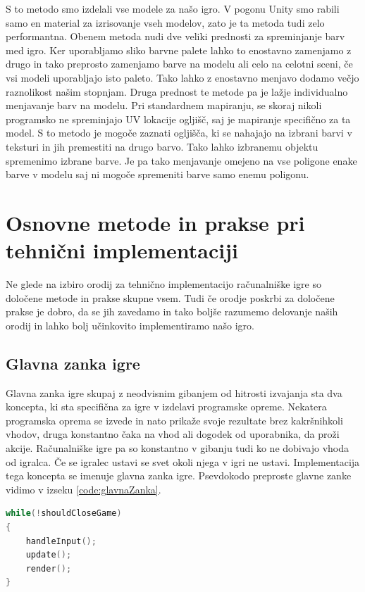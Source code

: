 \documentclass[12pt,a4paper,twoside]{book}
\begin{document}
S to metodo smo izdelali vse modele za našo igro. V pogonu Unity smo rabili samo en material za izrisovanje vseh modelov, zato je ta metoda tudi zelo performantna. Obenem metoda nudi dve veliki prednosti za spreminjanje barv med igro. Ker uporabljamo sliko barvne palete lahko to enostavno zamenjamo z drugo in tako preprosto zamenjamo barve na modelu ali celo na celotni sceni, če vsi modeli uporabljajo isto paleto. Tako lahko z enostavno menjavo dodamo večjo raznolikost našim stopnjam. Druga prednost te metode pa je lažje individualno menjavanje barv na modelu. Pri standardnem mapiranju, se skoraj nikoli programsko ne spreminjajo UV lokacije ogljišč, saj je mapiranje specifično za ta model. S to metodo je mogoče zaznati ogljišča, ki se nahajajo na izbrani barvi v teksturi in jih premestiti na drugo barvo. Tako lahko izbranemu objektu spremenimo izbrane barve. Je pa tako menjavanje omejeno na vse poligone enake barve v modelu saj ni mogoče spremeniti barve samo enemu poligonu.

\section{Osnovne metode in prakse pri tehnični implementaciji}
Ne glede na izbiro orodij za tehnično implementacijo računalniške igre so določene metode in prakse skupne vsem. Tudi če orodje poskrbi za določene prakse je dobro, da se jih zavedamo in tako boljše razumemo delovanje naših orodij in lahko bolj učinkovito implementiramo našo igro.

\subsection{Glavna zanka igre}
Glavna zanka igre skupaj z neodvisnim gibanjem od hitrosti izvajanja sta dva koncepta, ki sta specifična za igre v izdelavi programske opreme. Nekatera programska oprema se izvede in nato prikaže svoje rezultate brez kakršnihkoli vhodov, druga konstantno čaka na vhod ali dogodek od uporabnika, da proži akcije. Računalniške igre pa so konstantno v gibanju tudi ko ne dobivajo vhoda od igralca. Če se igralec ustavi se svet okoli njega v igri ne ustavi. Implementacija tega koncepta se imenuje glavna zanka igre. Psevdokodo preproste glavne zanke vidimo v izseku \ref{code:glavnaZanka}.

\begin{lstlisting}[label=code:glavnaZanka, language=C++, caption=Glavna zanka igre]
while(!shouldCloseGame)
{
	handleInput();
	update();
	render();
}
\end{lstlisting}
\end{document}
